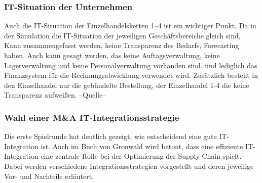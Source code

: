 \documentclass[a4paper,12pt]{article}
\begin{document}
\subsubsection{IT-Situation der Unternehmen}
Auch die IT-Situation der Einzelhandelsketten 1–4 ist ein wichtiger Punkt,
Da in der Simulation die IT-Situation der jeweiligen Geschäftsbereiche gleich sind,
Kann zusammengefasst werden, keine Transparenz des Bedarfs, Forecasting haben.
Auch kann gesagt werden, das keine Auftagsverwaltung, keine Lagerverwaltung und keine Personalverwaltung
vorhanden sind. und lediglich das Finanzsystem für die Rechnungsabwicklung verwendet wird.
Zusätzlich besteht in den Einzelhandel nur die gebündelte Bestellung, der Einzelhandel 1-4 
die keine Transparenz aufweißen. --Quelle--


\subsubsection{Wahl einer M\&A IT-Integrationsstrategie}
Die erste Spielrunde hat deutlich gezeigt, wie entscheidend eine gute IT-Integration ist.
Auch im Buch von Gronwald wird betont, dass eine effiziente IT-Integration eine zentrale Rolle bei der Optimierung der Supply Chain spielt.
Dabei werden verschiedene Integrationsstrategien vorgestellt und deren jeweilige Vor- und Nachteile erläutert.
\end{document}
